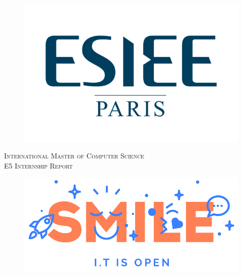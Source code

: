 \documentclass[12pt,a4paper,oneside]{article}
\begin{document}

\begin{titlepage} %
	\newcommand{\HRule}{\rule{\linewidth}{0.5mm}} %

	\center %

	\begin{figure}[H]
	\centering
	  \includegraphics[scale=1.8]{img/logo_esiee.png}
	  \label{fig:logo_esiee}
	\end{figure}

	\textsc{\Large International Master of Computer Science}\\[0.5cm] %

	\textsc{\Large E5 Internship Report}\\[0.4cm] %

	\vspace*{30px}

	\begin{figure}[H]
	\centering
	  \includegraphics[scale=0.4]{img/smile.png}
	  \label{fig:logo_esiee}
	\end{figure}


\end{titlepage}
\end{document}
